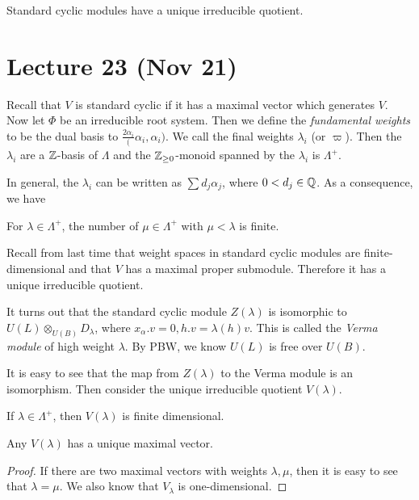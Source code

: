 \documentclass[twoside, 10pt]{article}
\begin{document}
    \begin{cor} Standard cyclic modules have a unique irreducible quotient.
    \end{cor}

    \section{Lecture 23 (Nov 21)}%
    
    Recall that $V$ is standard cyclic if it has a maximal vector which
    generates $V$. Now let $\Phi$ be an irreducible root system. Then we define
    the \textit{fundamental weights} to be the dual basis to
    $\frac{2\alpha_i}(\alpha_i, \alpha_i)$. We call the final weights
    $\lambda_i$ (or $\varpi$). Then the $\lambda_i$ are a $\mathbb{Z}$-basis of
    $\Lambda$ and the $\mathbb{Z}_{\geq 0}$-monoid spanned by the $\lambda_i$ is
    $\Lambda^+$.

    In general, the $\lambda_i$ can be written as $\sum d_j\alpha_j$, where $0
    < d_j \in \mathbb{Q}$. As a consequence, we have

    \begin{prop} For $\lambda \in \Lambda^+$, the number of $\mu \in \Lambda^+$
    with $\mu < \lambda$ is finite.  \end{prop}

    Recall from last time that weight spaces in standard cyclic modules are
    finite-dimensional and that $V$ has a maximal proper submodule. Therefore
    it has a unique irreducible quotient. 

    It turns out that the standard cyclic module $Z(\lambda)$ is isomorphic to
    $U(L) \otimes_{U(B)} D_{\lambda}$, where $x_{\alpha}.v = 0, h.v =
    \lambda(h)v$. This is called the \textit{Verma module} of high weight
    $\lambda$. By PBW, we know $U(L)$ is free over $U(B)$.

    It is easy to see that the map from $Z(\lambda)$ to the Verma module is an
    isomorphism. Then consider the unique irreducible quotient $V(\lambda)$.

    \begin{thm} If $\lambda \in \Lambda^+$, then $V(\lambda)$ is finite
    dimensional.  \end{thm}
    
    \begin{lem} Any $V(\lambda)$ has a unique maximal vector.  \end{lem}

    \begin{proof} If there are two maximal vectors with weights $\lambda, \mu$,
    then it is easy to see that $\lambda = \mu$. We also know that
$V_{\lambda}$ is one-dimensional.  \end{proof}
\end{document}
